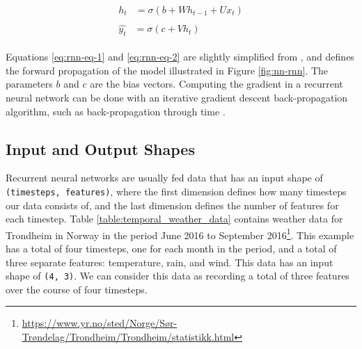 \begin{align}
    \begin{split}\label{eq:rnn-eq-1}
        h_{t}&=\sigma(b+Wh_{t-1}+Ux_{t})
    \end{split}\\
    \begin{split}\label{eq:rnn-eq-2}
        \hat{y_{t}}&=\sigma(c+Vh_{t})
    \end{split}
\end{align}

Equations \ref{eq:rnn-eq-1} and \ref{eq:rnn-eq-2} are slightly simplified from \citet[pp.~378--381]{goodfellow2016deeplearning}, and defines the forward propagation of the model illustrated in Figure \ref{fig:nn-rnn}. The parameters \(b\) and \(c\) are the bias vectors. Computing the gradient in a recurrent neural network can be done with an iterative gradient descent back-propagation algorithm, such as back-propagation through time \citep{werbos1990backpropagation, rumelhart1988learning}. 

\subsection{Input and Output Shapes}
\label{sec:input_and_output_shapes}
Recurrent neural networks are usually fed data that has an input shape of {\tt (timesteps, features)}, where the first dimension defines how many timesteps our data consists of, and the last dimension defines the number of features for each timestep. Table \ref{table:temporal_weather_data} contains weather data for Trondheim in Norway in the period June 2016 to September 2016\footnote{\url{https://www.yr.no/sted/Norge/Sør-Trøndelag/Trondheim/Trondheim/statistikk.html}}. This example has a total of four timesteps, one for each month in the period, and a total of three separate features: temperature, rain, and wind. This data has an input shape of {\tt (4, 3)}. We can consider this data as recording a total of three features over the course of four timesteps.

